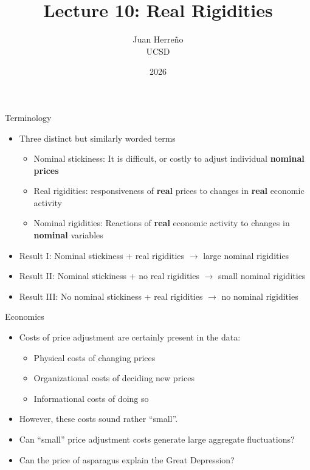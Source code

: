 \documentclass[11pt,aspectratio=169,xcolor={dvipsnames},hyperref={pdftex,pdfpagemode=UseNone,hidelinks,pdfdisplaydoctitle=true},usepdftitle=false]{beamer}
\title{Lecture 10: Real Rigidities}
\author{Juan Herre\~{n}o\\UCSD}
\date{2026}
\begin{document}
\maketitle

\begin{frame}{Terminology}
\begin{itemize}
\item Three distinct but similarly worded terms
\begin{itemize}
\item Nominal stickiness: It is difficult, or costly to adjust individual \textbf{nominal prices}
\item Real rigidities: responsiveness of \textbf{real} prices to changes in \textbf{real} economic activity
\item Nominal rigidities: Reactions of \textbf{real} economic activity to changes in \textbf{nominal} variables
\end{itemize}
\item Result I: Nominal stickiness + real rigidities $\rightarrow$ large nominal rigidities
\item Result II: Nominal stickiness + no real rigidities $\rightarrow$ small nominal rigidities
\item Result III: No nominal stickiness + real rigidities $\rightarrow$ no nominal rigidities
\end{itemize}
\end{frame}

\begin{frame}{Economics}
\begin{itemize}
\item Costs of price adjustment are certainly present in the data:
\begin{itemize}
\item Physical costs of changing prices
\item Organizational costs of deciding new prices
\item Informational costs of doing so
\end{itemize}
\item However, these costs sound rather ``small''.
\item Can ``small'' price adjustment costs generate large aggregate fluctuations?
\item Can the price of asparagus explain the Great Depression?
\end{itemize}
\end{frame}
\end{document}
